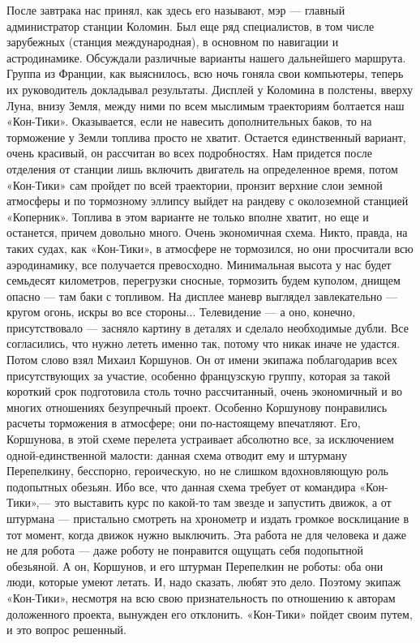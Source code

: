 \documentclass[11pt,a4paper,oneside]{article}
\begin{document}
После завтрака нас принял, как здесь его называют, мэр — главный администратор станции Коломин. Был еще ряд специалистов, в том числе зарубежных (станция международная), в основном по навигации и астродинамике. Обсуждали различные варианты нашего дальнейшего маршрута. Группа из Франции, как выяснилось, всю ночь гоняла свои компьютеры, теперь их руководитель докладывал результаты. Дисплей у Коломина в полстены, вверху Луна, внизу Земля, между ними по всем мыслимым траекториям болтается наш «Кон-Тики». Оказывается, если не навесить дополнительных баков, то на торможение у Земли топлива просто не хватит. Остается единственный вариант, очень красивый, он рассчитан во всех подробностях. Нам придется после отделения от станции лишь включить двигатель на определенное время, потом «Кон-Тики» сам пройдет по всей траектории, пронзит верхние слои земной атмосферы и по тормозному эллипсу выйдет на рандеву с околоземной станцией «Коперник». Топлива в этом варианте не только вполне хватит, но еще и останется, причем довольно много. Очень экономичная схема. Никто, правда, на таких судах, как «Кон-Тики», в атмосфере не тормозился, но они просчитали всю аэродинамику, все получается превосходно. Минимальная высота у нас будет семьдесят километров, перегрузки сносные, тормозить будем куполом, днищем опасно — там баки с топливом. На дисплее маневр выглядел завлекательно — кругом огонь, искры во все стороны... Телевидение — а оно, конечно, присутствовало — засняло картину в деталях и сделало необходимые дубли. Все согласились, что нужно лететь именно так, потому что никак иначе не удастся. Потом слово взял Михаил Коршунов. Он от имени экипажа поблагодарив всех присутствующих за участие, особенно французскую группу, которая за такой короткий срок подготовила столь точно рассчитанный, очень экономичный и во многих отношениях безупречный проект. Особенно Коршунову понравились расчеты торможения в атмосфере; они по-настоящему впечатляют. Его, Коршунова, в этой схеме перелета устраивает абсолютно все, за исключением одной-единственной малости: данная схема отводит ему и штурману Перепелкину, бесспорно, героическую, но не слишком вдохновляющую роль подопытных обезьян. Ибо все, что данная схема требует от командира «Кон-Тики»,— это выставить курс по какой-то там звезде и запустить движок, а от штурмана — пристально смотреть на хронометр и издать громкое восклицание в тот момент, когда движок нужно выключить. Эта работа не для человека и даже не для робота — даже роботу не понравится ощущать себя подопытной обезьяной. А он, Коршунов, и его штурман Перепелкин не роботы: оба они люди, которые умеют летать. И, надо сказать, любят это дело. Поэтому экипаж «Кон-Тики», несмотря на всю свою признательность по отношению к авторам доложенного проекта, вынужден его отклонить. «Кон-Тики» пойдет своим путем, и это вопрос решенный.
\end{document}
